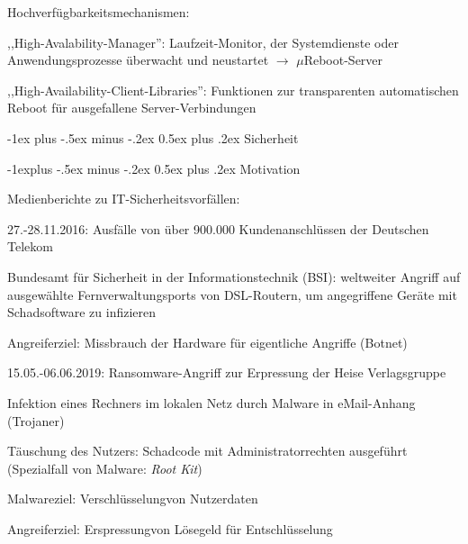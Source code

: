 \documentclass[a4paper]{article}
\makeatletter
\renewcommand{\section}{\@startsection{section}{1}{0mm}%
 {-1ex plus -.5ex minus -.2ex}%
 {0.5ex plus .2ex}%
 {\normalfont\large\bfseries}}
\renewcommand{\subsection}{\@startsection{subsection}{2}{0mm}%
 {-1explus -.5ex minus -.2ex}%
 {0.5ex plus .2ex}%
 {\normalfont\normalsize\bfseries}}
\makeatother
\begin{document}
\begin{multicols}{3}
    Hochverfügbarkeitsmechanismen:

    \begin{enumerate*}
        \item
        ,,High-Avalability-Manager'': Laufzeit-Monitor, der Systemdienste oder
        Anwendungsprozesse überwacht und neustartet
        $\rightarrow$ $\mu$Reboot-Server
        \item
        ,,High-Availability-Client-Libraries'': Funktionen zur transparenten
        automatischen Reboot für ausgefallene Server-Verbindungen
    \end{enumerate*}


    \section{Sicherheit}


    \subsection{Motivation}

    Medienberichte zu IT-Sicherheitsvorfällen:

    \begin{itemize*}
        \item
        27.-28.11.2016: Ausfälle von über 900.000 Kundenanschlüssen der
        Deutschen Telekom
        \begin{itemize*}
            \item Bundesamt für Sicherheit in der Informationstechnik (BSI): weltweiter Angriff auf ausgewählte Fernverwaltungsports von DSL-Routern, um angegriffene Geräte mit Schadsoftware zu infizieren
            \item Angreiferziel: Missbrauch der Hardware für eigentliche Angriffe (Botnet)
        \end{itemize*}
        \item
        15.05.-06.06.2019: Ransomware-Angriff zur Erpressung der Heise
        Verlagsgruppe
        \begin{itemize*}
            \item Infektion eines Rechners im lokalen Netz durch Malware in eMail-Anhang (Trojaner)
            \item Täuschung des Nutzers: Schadcode mit Administratorrechten ausgeführt (Spezialfall von Malware: \emph{Root Kit})
            \item Malwareziel: Verschlüsselungvon Nutzerdaten
            \item Angreiferziel: Erspressungvon Lösegeld für Entschlüsselung
        \end{itemize*}
    \end{itemize*}


\end{multicols}
\end{document}
